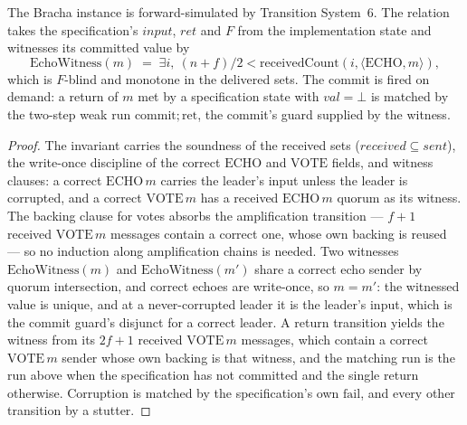 \begin{theorem}
  \label{thm:brb-refines}
  \leanok
  The Bracha instance is forward-simulated by Transition System~6.
  The relation takes the specification's $input$, $ret$ and $F$ from the implementation state and witnesses its committed value by
  \[
    \mathrm{EchoWitness}(m) \;=\; \exists i,\ (n+f)/2 < \mathrm{receivedCount}(i, \langle\mathrm{ECHO}, m\rangle),
  \]
  which is $F$-blind and monotone in the delivered sets.
  The commit is fired on demand: a return of $m$ met by a specification state with $val = \bot$ is matched by the two-step weak run $\mathrm{commit}; \mathrm{ret}$, the commit's guard supplied by the witness.
\end{theorem}

\begin{proof}\leanok
  The invariant carries the soundness of the received sets ($received \subseteq sent$), the write-once discipline of the correct $\mathrm{ECHO}$ and $\mathrm{VOTE}$ fields, and witness clauses: a correct $\mathrm{ECHO}\,m$ carries the leader's input unless the leader is corrupted, and a correct $\mathrm{VOTE}\,m$ has a received $\mathrm{ECHO}\,m$ quorum as its witness.
  The backing clause for votes absorbs the amplification transition --- $f{+}1$ received $\mathrm{VOTE}\,m$ messages contain a correct one, whose own backing is reused --- so no induction along amplification chains is needed.
  Two witnesses $\mathrm{EchoWitness}(m)$ and $\mathrm{EchoWitness}(m')$ share a correct echo sender by quorum intersection, and correct echoes are write-once, so $m = m'$: the witnessed value is unique, and at a never-corrupted leader it is the leader's input, which is the commit guard's disjunct for a correct leader.
  A return transition yields the witness from its $2f{+}1$ received $\mathrm{VOTE}\,m$ messages, which contain a correct $\mathrm{VOTE}\,m$ sender whose own backing is that witness, and the matching run is the run above when the specification has not committed and the single return otherwise.
  Corruption is matched by the specification's own $\mathrm{fail}$, and every other transition by a stutter.
\end{proof}
